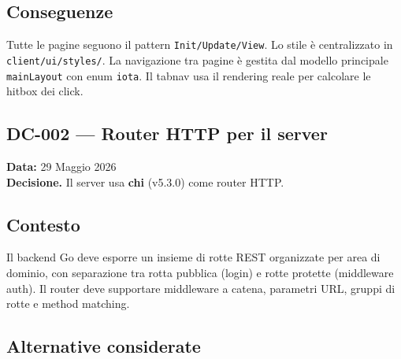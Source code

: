 \documentclass[a4paper,12pt]{article}
\begin{document}

\subsection*{Conseguenze}
Tutte le pagine seguono il pattern \texttt{Init/Update/View}. Lo stile \`{e} centralizzato in \texttt{client/ui/styles/}. La navigazione tra pagine \`{e} gestita dal modello principale \texttt{mainLayout} con enum \texttt{iota}. Il tabnav usa il rendering reale per calcolare le hitbox dei click.

\newpage
\begin{decisionbox}
\section*{DC-002 --- Router HTTP per il server}
\textbf{Data:} 29 Maggio 2026\\
\textbf{Decisione.} Il server usa \textbf{chi} (v5.3.0) come router HTTP.
\end{decisionbox}

\subsection*{Contesto}
Il backend Go deve esporre un insieme di rotte REST organizzate per area di dominio, con separazione tra rotta pubblica (login) e rotte protette (middleware auth). Il router deve supportare middleware a catena, parametri URL, gruppi di rotte e method matching.


\subsection*{Alternative considerate}
\end{document}
